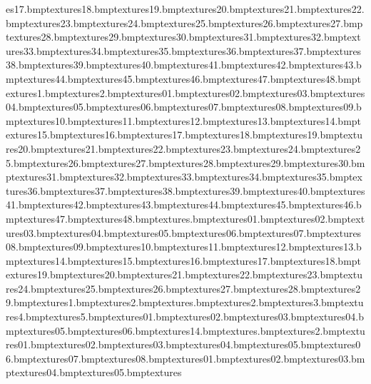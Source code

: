 es\sandrock17.bmp textures\sandrock18.bmp textures\sandrock19.bmp textures\sandrock20.bmp textures\sandrock21.bmp textures\sandrock22.bmp textures\sandrock23.bmp textures\sandrock24.bmp textures\sandrock25.bmp textures\sandrock26.bmp textures\sandrock27.bmp textures\sandrock28.bmp textures\sandrock29.bmp textures\sandrock30.bmp textures\sandrock31.bmp textures\sandrock32.bmp textures\sandrock33.bmp textures\sandrock34.bmp textures\sandrock35.bmp textures\sandrock36.bmp textures\sandrock37.bmp textures\sandrock38.bmp textures\sandrock39.bmp textures\sandrock40.bmp textures\sandrock41.bmp textures\sandrock42.bmp textures\sandrock43.bmp textures\sandrock44.bmp textures\sandrock45.bmp textures\sandrock46.bmp textures\sandrock47.bmp textures\sandrock48.bmp textures\sandstep1.bmp textures\sandstep2.bmp textures\sharprock01.bmp textures\sharprock02.bmp textures\sharprock03.bmp textures\sharprock04.bmp textures\sharprock05.bmp textures\sharprock06.bmp textures\sharprock07.bmp textures\sharprock08.bmp textures\sharprock09.bmp textures\sharprock10.bmp textures\sharprock11.bmp textures\sharprock12.bmp textures\sharprock13.bmp textures\sharprock14.bmp textures\sharprock15.bmp textures\sharprock16.bmp textures\sharprock17.bmp textures\sharprock18.bmp textures\sharprock19.bmp textures\sharprock20.bmp textures\sharprock21.bmp textures\sharprock22.bmp textures\sharprock23.bmp textures\sharprock24.bmp textures\sharprock25.bmp textures\sharprock26.bmp textures\sharprock27.bmp textures\sharprock28.bmp textures\sharprock29.bmp textures\sharprock30.bmp textures\sharprock31.bmp textures\sharprock32.bmp textures\sharprock33.bmp textures\sharprock34.bmp textures\sharprock35.bmp textures\sharprock36.bmp textures\sharprock37.bmp textures\sharprock38.bmp textures\sharprock39.bmp textures\sharprock40.bmp textures\sharprock41.bmp textures\sharprock42.bmp textures\sharprock43.bmp textures\sharprock44.bmp textures\sharprock45.bmp textures\sharprock46.bmp textures\sharprock47.bmp textures\sharprock48.bmp textures\sign.bmp textures\sign01.bmp textures\sign02.bmp textures\sign03.bmp textures\sign04.bmp textures\sign05.bmp textures\sign06.bmp textures\sign07.bmp textures\sign08.bmp textures\sign09.bmp textures\sign10.bmp textures\sign11.bmp textures\sign12.bmp textures\sign13.bmp textures\sign14.bmp textures\sign15.bmp textures\sign16.bmp textures\sign17.bmp textures\sign18.bmp textures\sign19.bmp textures\sign20.bmp textures\sign21.bmp textures\sign22.bmp textures\sign23.bmp textures\sign24.bmp textures\sign25.bmp textures\sign26.bmp textures\sign27.bmp textures\sign28.bmp textures\sign29.bmp textures\simplewall1.bmp textures\simplewall2.bmp textures\simplewallextra.bmp textures\simplewallextra2.bmp textures\simplewallextra3.bmp textures\simplewallextra4.bmp textures\simplewallextra5.bmp textures\slide01.bmp textures\slide02.bmp textures\slide03.bmp textures\slide04.bmp textures\slide05.bmp textures\slide06.bmp textures\slide14.bmp textures\snow.bmp textures\snow2.bmp textures\snowdecal01.bmp textures\snowdecal02.bmp textures\snowdecal03.bmp textures\snowdecal04.bmp textures\snowdecal05.bmp textures\snowdecal06.bmp textures\snowdecal07.bmp textures\snowdecal08.bmp textures\snowtograss01.bmp textures\snowtograss02.bmp textures\snowtograss03.bmp textures\snowtograss04.bmp textures\snowtograss05.bmp textures\sno
